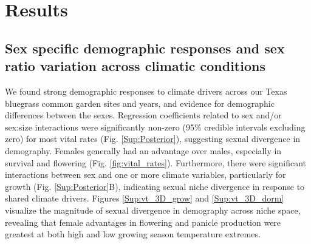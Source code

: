 \documentclass[12pt]{article}\usepackage[]{graphicx}\usepackage[dvipsnames]{xcolor}
\newcommand{\tom}[2]{{\color{red}{#1}}\footnote{\textit{\color{red}{#2}}}}
\begin{document}
\section*{Results}

\subsection*{Sex specific demographic responses and sex ratio variation across climatic conditions}
We found strong demographic responses to climate drivers across our Texas bluegrass common garden sites and years, and evidence for demographic differences between the sexes. 
Regression coefficients related to sex and/or sex:size interactions were significantly non-zero (95\% credible intervals excluding zero) for most vital rates (Fig. \ref{Sup:Posterior}), suggesting sexual divergence in demography. 
Females generally had an advantage over males, especially in survival and flowering (Fig. \ref{fig:vital_rates}). 
Furthermore, there were significant interactions between sex and one or more climate variables, particularly for growth (Fig. \ref{Sup:Posterior}B), indicating sexual niche divergence in response to shared climate drivers.  
Figures \ref{Sup:vt_3D_grow} and \ref{Sup:vt_3D_dorm} visualize the magnitude of sexual divergence in demography across niche space, revealing that female advantages in flowering and panicle production were greatest at both high and low growing season temperature extremes. 

\end{document}
